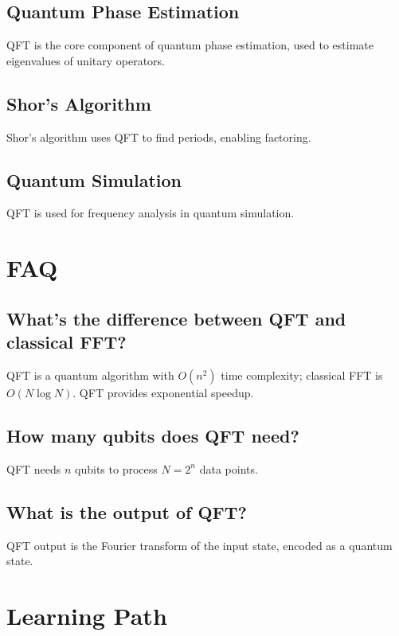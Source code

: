 \documentclass[12pt,a4paper]{article}
\begin{document}
\subsection{Quantum Phase Estimation}

QFT is the core component of quantum phase estimation, used to estimate eigenvalues of unitary operators.

\subsection{Shor's Algorithm}

Shor's algorithm uses QFT to find periods, enabling factoring.

\subsection{Quantum Simulation}

QFT is used for frequency analysis in quantum simulation.

\section{FAQ}

\subsection{What's the difference between QFT and classical FFT?}

QFT is a quantum algorithm with $O(n^2)$ time complexity; classical FFT is $O(N \log N)$. QFT provides exponential speedup.

\subsection{How many qubits does QFT need?}

QFT needs $n$ qubits to process $N=2^n$ data points.

\subsection{What is the output of QFT?}

QFT output is the Fourier transform of the input state, encoded as a quantum state.

\section{Learning Path}
\end{document}
